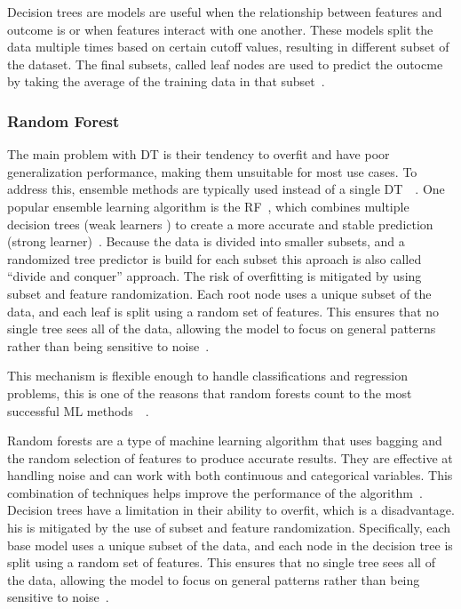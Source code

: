 Decision trees are models are useful when the relationship between features
and outcome is or when features interact with one another.
These models split the data multiple times based on certain cutoff values,
resulting in different subset of the dataset.
The final subsets, called leaf nodes are used to predict the outocme by
taking the average of the training data in that subset~\cite[p. 76]{
    molnar2020interpretable}.

\subsubsection{Random Forest}\label{subsubsec:random-forest-regression}
The main problem with \ac{DT} is their tendency to overfit and have poor
generalization performance, making them unsuitable for most use cases.
To address this, ensemble methods are typically used instead of a single DT~\cite[p. 78]{
    muller_introductionmachinelearning_2016}~\cite[p. 251]{liu_newmachinelearning_2012}.
One popular ensemble learning algorithm is the \ac{RF}~\cite[]{
    breiman_randomforests_2001}, which combines multiple decision trees (weak learners
) to create a more accurate and stable prediction (strong learner)~\cite[p. 24]{
    awad_efficientlearningmachines_2015}.
Because the data is divided into smaller subsets, and a randomized tree predictor is
build for each subset this aproach is also called ``divide and conquer'' approach.
The risk of overfitting is mitigated by using subset and feature randomization.
Each root node uses a unique subset of the data, and
each leaf is split using a random set of features.
This ensures that no single tree sees all of the data, allowing the model to focus on
general patterns rather than being
sensitive to noise~\cite[p. 251]{liu_newmachinelearning_2012}.

This mechanism is flexible enough to handle classifications and regression problems,
this is one of the reasons that random forests count to the most successful \ac{ML}
methods~\cite[p.
3-4]{biau_randomforestguided_2016}~\cite[p. 25]{breiman_randomforests_2001}.

%
%
Random forests are a type of machine learning algorithm that uses bagging and the
random selection of features to produce accurate results.
They are effective at handling noise and can work with both continuous and categorical
variables.
This combination of techniques helps improve the performance of the algorithm~\cite[p.
259]{liu_newmachinelearning_2012}.
Decision trees have a limitation in their ability to overfit, which is a
disadvantage.
his is mitigated by the use of subset and feature randomization.
Specifically, each base model uses a unique subset of the data, and each node in
the decision tree is split using a random set of features.
This ensures that no single tree sees all of the data, allowing the model to focus on
general patterns rather than being sensitive to noise~\cite[p. 259]{
    liu_newmachinelearning_2012}.

